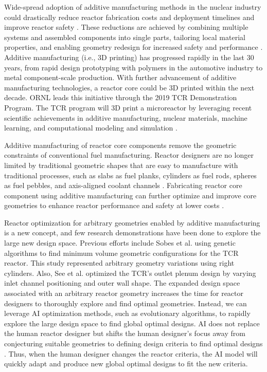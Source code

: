Wide-spread adoption of additive manufacturing methods in the nuclear industry 
could drastically reduce reactor fabrication costs and deployment timelines 
and improve reactor safety \cite{simpson_considerations_2019}. 
These reductions are achieved by combining multiple systems and assembled 
components into single parts, tailoring local material properties, and 
enabling geometry redesign for increased safety and performance 
\cite{simpson_considerations_2019}. 
Additive manufacturing (i.e., 3D printing) has progressed rapidly in the last 
30 years, from rapid design prototyping with polymers in the automotive industry 
to metal component-scale production. With further advancement of additive 
manufacturing technologies, a reactor core could be 3D printed within the next decade. 
\gls{ORNL} leads this initiative through the 2019 \gls{TCR} Demonstration Program. 
The \gls{TCR} program will 3D print a microreactor by leveraging recent scientific 
achievements in additive manufacturing, nuclear materials, machine learning, and 
computational modeling and simulation \cite{terrani_transformational_2019}.

Additive manufacturing of reactor core components remove the geometric constraints of 
conventional fuel manufacturing. 
Reactor designers are no longer limited by traditional geometric shapes that are easy 
to manufacture with traditional processes, such as slabs as fuel planks, cylinders as 
fuel rods, spheres as fuel pebbles, and axis-aligned coolant channels 
\cite{sobes_artificial_2020}. 
Fabricating reactor core component using additive manufacturing can further optimize 
and improve core geometries to enhance reactor performance and safety at lower costs 
\cite{bergeron_early_2018}.

Reactor optimization for arbitrary geometries enabled by additive manufacturing is a 
new concept, and few research demonstrations have been done to explore the large 
new design space. 
Previous efforts include Sobes et al. \cite{sobes_artificial_2020} using genetic 
algorithms to find minimum volume geometric configurations for the TCR reactor. 
This study represented arbitrary geometry variations using right cylinders. 
Also, See et al. \cite{see_design_2022} optimized the TCR's outlet plenum design 
by varying inlet channel positioning and outer wall shape.  
The expanded design space associated with an arbitrary reactor geometry increases 
the time for reactor designers to thoroughly explore and find optimal geometries. 
Instead, we can leverage \gls{AI} optimization methods, such as evolutionary algorithms, 
to rapidly explore the large design space to find global optimal designs. 
\gls{AI} does not replace the human reactor designer but shifts the human designer's 
focus away from conjecturing suitable geometries to defining design criteria to 
find optimal designs \cite{sobes_artificial_2020}. 
Thus, when the human designer changes the reactor criteria, the AI model will quickly 
adapt and produce new global optimal designs to fit the new criteria.


